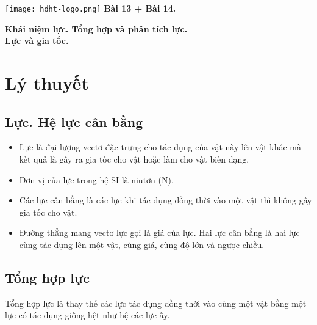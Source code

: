 \newcommand{\chapter}[2][]{
	\newcommand{\chapname}{#2}
	\begin{flushleft}
		\begin{minipage}[t]{\linewidth}
			\texttt{[image: hdht-logo.png]}
			\hspace{0pt}	
			\sffamily\bfseries\large Bài  13 + Bài 14.
			\begin{flushleft}
				\LARGE\bfseries #1
			\end{flushleft}
		\end{minipage}
	\end{flushleft}
	\vspace{1cm}
	\normalfont\normalsize
}
\chapter[Khái niệm lực. Tổng hợp và phân tích lực. \\ Lực và gia tốc.]{Khái niệm lực. Tổng hợp và phân tích lực. \\ Lực và gia tốc.}
\section{Lý thuyết}
\subsection{Lực. Hệ lực cân bằng}
	\begin{itemize}
	\item Lực là đại lượng vectơ đặc trưng cho tác dụng của vật này lên vật khác mà kết quả là gây ra gia tốc cho vật hoặc làm cho vật biến dạng.
	\item Đơn vị của lực trong hệ SI là niutơn (N).
	\item Các lực cân bằng là các lực khi tác dụng đồng thời vào một vật thì không gây gia tốc cho vật.
	\item Đường thẳng mang vectơ lực gọi là giá của lực. Hai lực cân bằng là hai lực cùng tác dụng lên một vật, cùng giá, cùng độ lớn và ngược chiều.

\end{itemize}
\subsection{Tổng hợp lực}
Tổng hợp lực là thay thế các lực tác dụng đồng thời vào cùng một vật bằng một lực có tác dụng giống hệt như hệ các lực ấy.


